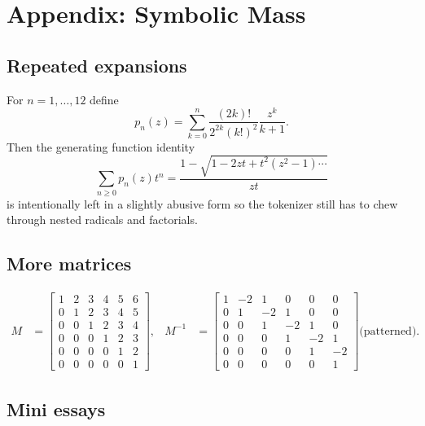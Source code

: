 \chapter{Appendix: Symbolic Mass}
\label{ch:appendix}

\section{Repeated expansions}
For $n=1,\dots,12$ define
\begin{equation}
p_{n}(z)
=
\sum_{k=0}^{n}
\frac{(2k)!}{2^{2k}(k!)^{2}}
\frac{z^{k}}{k+1}.
\end{equation}
Then the generating function identity
\begin{equation}
\sum_{n\ge0}p_{n}(z)t^{n}
=
\frac{1-\sqrt{1-2zt+t^{2}(z^{2}-1)\cdots}}{zt}
\end{equation}
is intentionally left in a slightly abusive form so the tokenizer still has
to chew through nested radicals and factorials.

\section{More matrices}
\begin{align*}
M &=
\begin{bmatrix}
1 & 2 & 3 & 4 & 5 & 6 \\
0 & 1 & 2 & 3 & 4 & 5 \\
0 & 0 & 1 & 2 & 3 & 4 \\
0 & 0 & 0 & 1 & 2 & 3 \\
0 & 0 & 0 & 0 & 1 & 2 \\
0 & 0 & 0 & 0 & 0 & 1
\end{bmatrix},
&
M^{-1} &=
\begin{bmatrix}
1 & -2 & 1 & 0 & 0 & 0 \\
0 & 1 & -2 & 1 & 0 & 0 \\
0 & 0 & 1 & -2 & 1 & 0 \\
0 & 0 & 0 & 1 & -2 & 1 \\
0 & 0 & 0 & 0 & 1 & -2 \\
0 & 0 & 0 & 0 & 0 & 1
\end{bmatrix}
\text{(patterned)}.
\end{align*}

\section{Mini essays}

